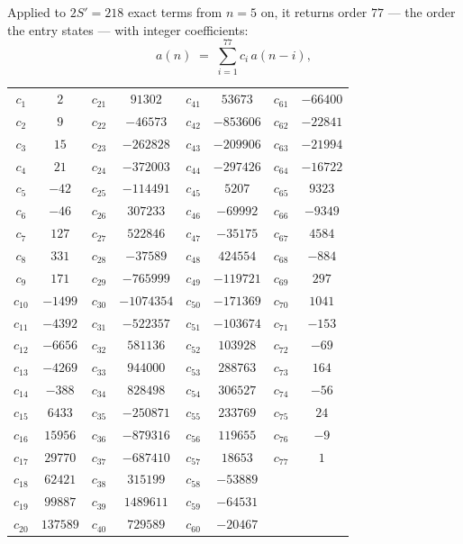 \documentclass[11pt,a4paper]{article}
\theoremstyle{plain}
\theoremstyle{definition}
\begin{document}
Applied to $2S'=218$ exact terms from $n=5$ on, it returns order $77$ --- the
order the entry states --- with integer coefficients:
\[
a(n)\;=\;\sum_{i=1}^{77}c_i\,a(n-i),
\]
\begin{center}\small
\begin{tabular}{cccccccc}
$c_{1}$ & $2$ & $c_{21}$ & $91302$ & $c_{41}$ & $53673$ & $c_{61}$ & $-66400$ \\
$c_{2}$ & $9$ & $c_{22}$ & $-46573$ & $c_{42}$ & $-853606$ & $c_{62}$ & $-22841$ \\
$c_{3}$ & $15$ & $c_{23}$ & $-262828$ & $c_{43}$ & $-209906$ & $c_{63}$ & $-21994$ \\
$c_{4}$ & $21$ & $c_{24}$ & $-372003$ & $c_{44}$ & $-297426$ & $c_{64}$ & $-16722$ \\
$c_{5}$ & $-42$ & $c_{25}$ & $-114491$ & $c_{45}$ & $5207$ & $c_{65}$ & $9323$ \\
$c_{6}$ & $-46$ & $c_{26}$ & $307233$ & $c_{46}$ & $-69992$ & $c_{66}$ & $-9349$ \\
$c_{7}$ & $127$ & $c_{27}$ & $522846$ & $c_{47}$ & $-35175$ & $c_{67}$ & $4584$ \\
$c_{8}$ & $331$ & $c_{28}$ & $-37589$ & $c_{48}$ & $424554$ & $c_{68}$ & $-884$ \\
$c_{9}$ & $171$ & $c_{29}$ & $-765999$ & $c_{49}$ & $-119721$ & $c_{69}$ & $297$ \\
$c_{10}$ & $-1499$ & $c_{30}$ & $-1074354$ & $c_{50}$ & $-171369$ & $c_{70}$ & $1041$ \\
$c_{11}$ & $-4392$ & $c_{31}$ & $-522357$ & $c_{51}$ & $-103674$ & $c_{71}$ & $-153$ \\
$c_{12}$ & $-6656$ & $c_{32}$ & $581136$ & $c_{52}$ & $103928$ & $c_{72}$ & $-69$ \\
$c_{13}$ & $-4269$ & $c_{33}$ & $944000$ & $c_{53}$ & $288763$ & $c_{73}$ & $164$ \\
$c_{14}$ & $-388$ & $c_{34}$ & $828498$ & $c_{54}$ & $306527$ & $c_{74}$ & $-56$ \\
$c_{15}$ & $6433$ & $c_{35}$ & $-250871$ & $c_{55}$ & $233769$ & $c_{75}$ & $24$ \\
$c_{16}$ & $15956$ & $c_{36}$ & $-879316$ & $c_{56}$ & $119655$ & $c_{76}$ & $-9$ \\
$c_{17}$ & $29770$ & $c_{37}$ & $-687410$ & $c_{57}$ & $18653$ & $c_{77}$ & $1$ \\
$c_{18}$ & $62421$ & $c_{38}$ & $315199$ & $c_{58}$ & $-53889$ &  &  \\
$c_{19}$ & $99887$ & $c_{39}$ & $1489611$ & $c_{59}$ & $-64531$ &  &  \\
$c_{20}$ & $137589$ & $c_{40}$ & $729589$ & $c_{60}$ & $-20467$ &  &  \\
\end{tabular}
\end{center}
\end{document}
